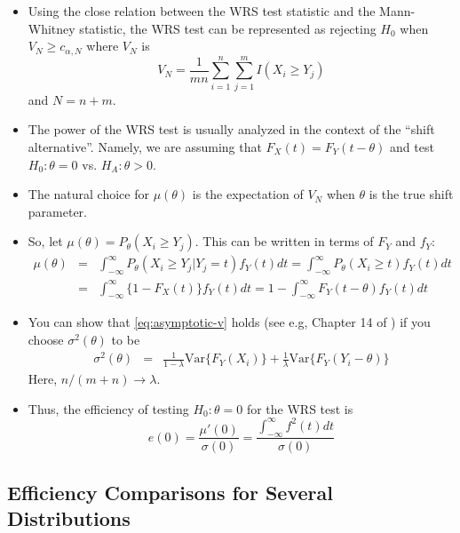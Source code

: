 \documentclass[]{book}
\begin{document}
\begin{itemize}
\item
  Using the close relation between the WRS test statistic and
  the Mann-Whitney statistic, the WRS test can be represented as
  rejecting \(H_{0}\) when \(V_{N} \geq c_{\alpha, N}\) where \(V_{N}\) is
  \begin{equation}
  V_{N} = \frac{1}{mn} \sum_{i=1}^{n}\sum_{j=1}^{m} I(X_{i} \geq Y_{j})
  \end{equation}
  and \(N = n + m\).
\item
  The power of the WRS test is usually analyzed in the context of
  the ``shift alternative''. Namely, we are assuming that \(F_{X}(t) = F_{Y}(t - \theta)\)
  and test \(H_{0}: \theta=0\) vs. \(H_{A}: \theta > 0\).
\item
  The natural choice for \(\mu(\theta)\) is the expectation of \(V_{N}\) when \(\theta\) is the true
  shift parameter.
\item
  So, let \(\mu(\theta) = P_{\theta}(X_{i} \geq Y_{j})\). This can be written in terms of \(F_{Y}\) and \(f_{Y}\):
  \begin{eqnarray}
  \mu(\theta) &=& \int_{-\infty}^{\infty} P_{\theta}( X_{i} \geq Y_{j} | Y_{j}=t) f_{Y}(t) dt
  = \int_{-\infty}^{\infty} P_{\theta}( X_{i} \geq t) f_{Y}(t) dt  \nonumber \\
  &=& \int_{-\infty}^{\infty} \{1 - F_{X}(t) \} f_{Y}(t) dt
  = 1 - \int_{-\infty}^{\infty} F_{Y}(t - \theta) f_{Y}(t) dt
  \end{eqnarray}
\item
  You can show that \eqref{eq:asymptotic-v} holds (see e.g, Chapter 14 of \citet{van2000})
  if you choose \(\sigma^{2}(\theta)\) to be
  \begin{eqnarray}
  \sigma^{2}(\theta) &=& \frac{1}{1 - \lambda}\textrm{Var}\{ F_{Y}(X_{i}) \} + \frac{1}{\lambda} \textrm{Var}\{ F_{Y}(Y_{i} - \theta) \}
  \end{eqnarray}
  Here, \(n/(m + n) \longrightarrow \lambda\).
\item
  Thus, the efficiency of testing \(H_{0}: \theta = 0\) for the WRS test is
  \begin{equation}
  e(0) = \frac{\mu'(0)}{\sigma(0)} = \frac{\int_{-\infty}^{\infty} f^{2}(t) dt}{\sigma(0)}
  \end{equation}
\end{itemize}

\hypertarget{efficiency-comparisons-for-several-distributions}{%
\subsection{Efficiency Comparisons for Several Distributions}\label{efficiency-comparisons-for-several-distributions}}
\end{document}
